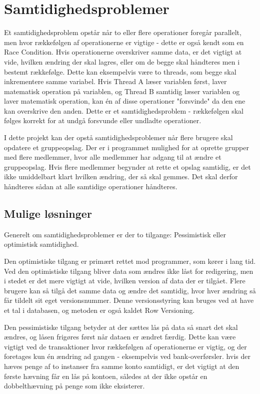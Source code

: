 \chapter{Samtidighedsproblemer}\label{ch:concurrency}
Et samtidighedsproblem opstår når to eller flere operationer foregår parallelt, men hvor rækkefølgen af operationerne er vigtige - dette er også kendt som en Race Condition.\cite{racecondition} Hvis operationerne overskriver samme data, er det vigtigt at vide, hvilken ændring der skal lagres, eller om de begge skal håndteres men i bestemt rækkefølge. Dette kan eksempelvis være to threads, som begge skal inkrementere samme variabel. Hvis Thread A læser variablen først, laver matematisk operation på variablen, og Thread B samtidig læser variablen og laver matematisk operation, kan én af disse operationer "forsvinde" da den ene kan overskrive den anden. Dette er et samtidighedsproblem - rækkefølgen skal følges korrekt for at undgå forsvunde eller undladte operationer.

I dette projekt kan der opstå samtidighedsproblemer når flere brugere skal opdatere et gruppeopslag. Der er i programmet mulighed for at oprette grupper med flere medlemmer, hvor alle medlemmer har adgang til at ændre et gruppeopslag. Hvis flere medlemmer begynder at rette et opslag samtidig, er det ikke umiddelbart klart hvilken ændring, der så skal gemmes. Det skal derfor håndteres sådan at alle samtidige operationer håndteres.


\section{Mulige løsninger}\label{sec:solutions}
Generelt om samtidighedsproblemer er der to tilgange: Pessimistisk eller optimistisk samtidighed. 

Den optimistiske tilgang er primært rettet mod programmer, som kører i lang tid. Ved den optimistiske tilgang bliver data som ændres ikke låst for redigering, men i stedet er det mere vigtigt at vide, hvilken version af data der er tilgået. Flere brugere kan så tilgå det samme data og ændre det samtidig, hvor hver ændring så får tildelt sit eget versionsnummer. Denne versionsstyring kan bruges ved at have et tal i databasen, og metoden er også kaldet Row Versioning\cite{rowversioning}.

Den pessimistiske tilgang betyder at der sættes lås på data så snart det skal ændres, og låsen frigøres først når dataen er ændret færdig. Dette kan være vigtigt ved de transaktioner hvor rækkefølgen af operationerne er vigtig, og der foretages kun én ændring ad gangen - eksempelvis ved bank-overførsler. hvis der hæves penge af to instanser fra samme konto samtidigt, er det vigtigt at den første hævning får en lås på kontoen, således at der ikke opstår en dobbelthævning på penge som ikke eksisterer. 


